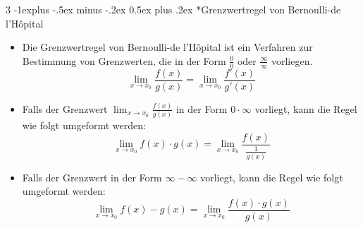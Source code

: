 \documentclass[10pt,landscape,a4paper]{article}
\makeatletter
\renewcommand{\subsection}{\@startsection{subsection}{2}{0mm}%
                                {-1explus -.5ex minus -.2ex}%
                                {0.5ex plus .2ex}%
                                {\normalfont\normalsize\bfseries}}
\makeatother
\begin{document}
\begin{multicols*}{3}
\subsection*{Grenzwertregel von Bernoulli-de l'Hôpital}
\begin{itemize}
  \item Die Grenzwertregel von Bernoulli-de l'Hôpital ist ein Verfahren zur Bestimmung von Grenzwerten, die in der Form $\frac{0}{0}$ oder $\frac{\infty}{\infty}$ vorliegen.
    \begin{equation*}
        \lim_{x \to x_0} \frac{f(x)}{g(x)} = \lim_{x \to x_0} \frac{f'(x)}{g'(x)}
    \end{equation*}
  \item Falls der Grenzwert $\lim_{x \to x_0} \frac{f(x)}{g(x)}$ in der Form $0 \cdot \infty$ vorliegt, kann die Regel wie folgt umgeformt werden:
    \begin{equation*}
        \lim_{x \to x_0} f(x) \cdot g(x) = \lim_{x \to x_0} \frac{f(x)}{\frac{1}{g(x)}}
    \end{equation*}
  \item Falls der Grenzwert in der Form $\infty - \infty$ vorliegt, kann die Regel wie folgt umgeformt werden:
    \begin{equation*}
        \lim_{x \to x_0} f(x) - g(x) = \lim_{x \to x_0} \frac{f(x) \cdot g(x)}{g(x)}
    \end{equation*}
\end{itemize}


\end{multicols*}
\end{document}
